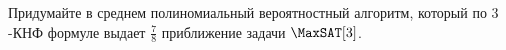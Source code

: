 Придумайте в среднем полиномиальный вероятностный алгоритм, который по $3$-КНФ формуле выдает
$\frac{7}{8}$ приближение задачи $\MaxSAT[3]$.

